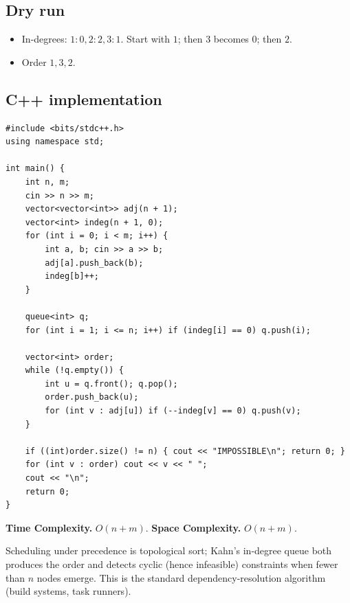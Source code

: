 \subsection*{Dry run}


\begin{itemize}
  \item In-degrees: $1{:}0,2{:}2,3{:}1$. Start with $1$; then $3$ becomes
        $0$; then $2$.
  \item Order $1,3,2$.
\end{itemize}

\subsection*{C++ implementation}

\begin{lstlisting}
#include <bits/stdc++.h>
using namespace std;

int main() {
    int n, m;
    cin >> n >> m;
    vector<vector<int>> adj(n + 1);
    vector<int> indeg(n + 1, 0);
    for (int i = 0; i < m; i++) {
        int a, b; cin >> a >> b;
        adj[a].push_back(b);
        indeg[b]++;
    }

    queue<int> q;
    for (int i = 1; i <= n; i++) if (indeg[i] == 0) q.push(i);

    vector<int> order;
    while (!q.empty()) {
        int u = q.front(); q.pop();
        order.push_back(u);
        for (int v : adj[u]) if (--indeg[v] == 0) q.push(v);
    }

    if ((int)order.size() != n) { cout << "IMPOSSIBLE\n"; return 0; }
    for (int v : order) cout << v << " ";
    cout << "\n";
    return 0;
}
\end{lstlisting}

\begin{complexitybox}
\textbf{Time Complexity.} $O(n+m)$. \textbf{Space Complexity.} $O(n+m)$.
\end{complexitybox}

\begin{takeawaybox}
Scheduling under precedence is topological sort; Kahn's in-degree queue both
produces the order and detects cyclic (hence infeasible) constraints when
fewer than $n$ nodes emerge. This is the standard dependency-resolution
algorithm (build systems, task runners).
\end{takeawaybox}
